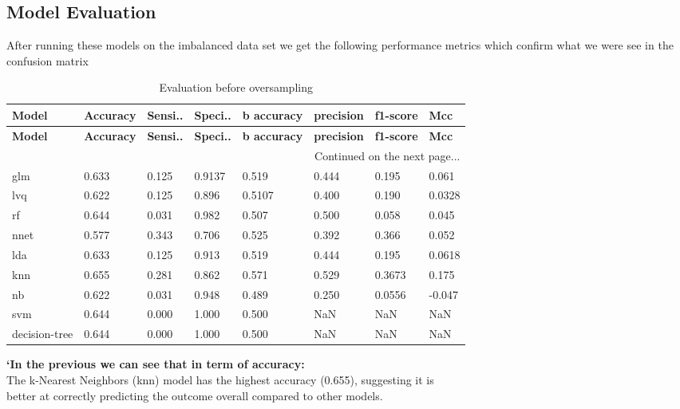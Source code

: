 \documentclass[12pt,a4paper]{article}
\begin{document}
\subsection{Model Evaluation}
 After running these models on the imbalanced data set we get the following performance metrics which confirm what we were see in the confusion matrix
  \begin{longtable}{llllllll}
  	\caption{Evaluation before oversampling} \\
  	\toprule
  	\textbf{Model} & \textbf{Accuracy} & \textbf{Sensi..} & \textbf{Speci..} & \textbf{b accuracy} & \textbf{precision} & \textbf{f1-score} & \textbf{Mcc} \\ 
  	\midrule
  	\endfirsthead
  	
  	\toprule
  	\textbf{Model} & \textbf{Accuracy} & \textbf{Sensi..} & \textbf{Speci..} & \textbf{b accuracy} & \textbf{precision} & \textbf{f1-score} & \textbf{Mcc} \\ 
  	\midrule
  	\endhead
  	
  	\midrule
  	\multicolumn{8}{r}{Continued on the next page...} \\
  	\midrule
  	\endfoot
  	
  	\bottomrule
  	\endlastfoot
  	
  glm&	0.633	&0.125	&0.9137 &0.519	&0.444	&0.195	&0.061\\	
  lvq&	0.622	&0.125	&0.896 &0.5107	&0.400	&0.190	&0.0328\\	
  rf&	0.644	&0.031	&0.982 &0.507	&0.500	&0.058	&0.045\\	
  \rowcolor{lightgreen}nnet&	0.577	&0.343	&0.706 &0.525	&0.392	&0.366	&0.052\\	
  \rowcolor{lightgreen} lda&	0.633	&0.125	&0.913 &0.519	&0.444	&0.195	&0.0618\\	
  \rowcolor{lightgreen}knn&	0.655	&0.281	&0.862 &0.571	&0.529	&0.3673	&0.175\\	
  nb&	0.622	&0.031	&0.948 &0.489	&0.250	&0.0556	&-0.047\\	
  svm &	0.644	&0.000	&1.000 &0.500	&NaN	&NaN	&NaN\\	
  decision-tree	&0.644	&0.000	&1.000 &0.500	&NaN	&NaN	&NaN\\
  	
  \end{longtable}
  
  \textbf{`In the previous we can see that in term of accuracy:} \\
  The k-Nearest Neighbors (knn) model has the highest accuracy (0.655), suggesting it is \\ better at correctly predicting the outcome overall compared to other models. \\
  
\end{document}
